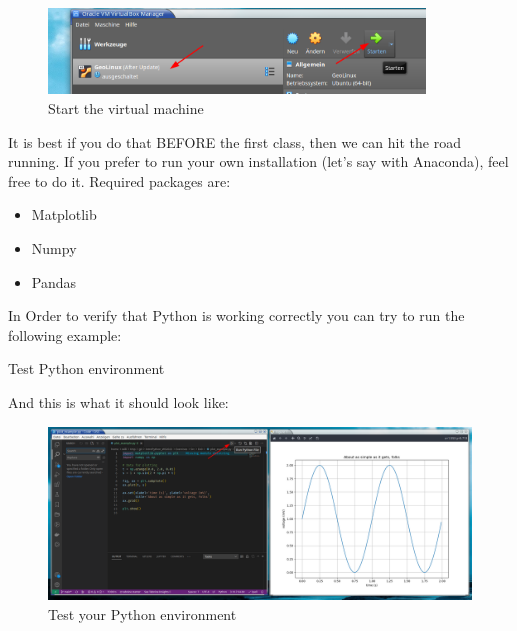 \begin{figure}[h!]
    \centering
    \includegraphics[width=10cm]{Figures/virtual_box2.png}
    \caption{Start the virtual machine}
\end{figure}

\vspace{1cm}

It is best if you do that BEFORE the first class, then we can hit the road running. If you prefer to run your own installation (let's say with Anaconda),
feel free to do it. Required packages are:

\begin{itemize}
    \item Matplotlib
    \item Numpy
    \item Pandas
\end{itemize}

In Order to verify that Python is working correctly you can try to run the following example:

\vspace{1cm}
\begin{tcolorbox}[enhanced jigsaw,breakable,pad at break*=1mm,
    colback=blue!5!white,colframe=babyblueeyes,title=Solutions,
    watermark color=white]
    Test Python environment
    
\end{tcolorbox}

\newpage

And this is what it should look like:

\vspace{1cm}

\begin{figure}[h!]
    \centering
    \includegraphics[width=18cm]{Figures/vs_code1.png}
    \caption{Test your Python environment}
\end{figure}

%    
